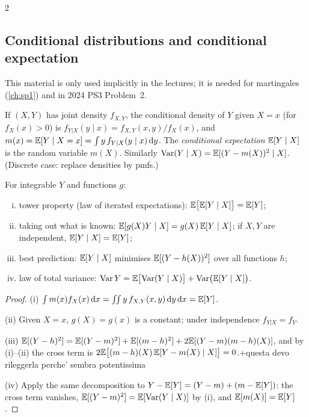 \begin{paracol}{2}
\subsection{Conditional distributions and conditional expectation}\label{ch03:sec-condexp}
This material is only used implicitly in the lectures; it is needed for martingales (\cref{ch:sp1}) and in
2024 PS3 Problem~2.

\begin{definition}
If $(X,Y)$ has joint density $f_{X,Y}$, the conditional density of $Y$ given $X=x$ (for $f_X(x)>0$) is
$f_{Y|X}(y\mid x)=f_{X,Y}(x,y)/f_X(x)$, and $m(x)=\mathbb{E}[Y\mid X=x]=\int y\,f_{Y|X}(y\mid x)\,\mathrm{d} y$. The
\emph{conditional expectation} $\mathbb{E}[Y\mid X]$ is the random variable $m(X)$. Similarly
$\operatorname{Var}(Y\mid X)=\mathbb{E}[(Y-m(X))^2\mid X]$. (Discrete case: replace densities by pmfs.)
\end{definition}

\begin{proposition}[Properties]\label{ch03:prop-condexp}
For integrable $Y$ and functions $g$:
\begin{enumerate}[(i)]
  \item tower property (law of iterated expectations): $\mathbb{E}\bigl[\mathbb{E}[Y\mid X]\bigr]=\mathbb{E}[Y]$;
  \item taking out what is known: $\mathbb{E}[g(X)Y\mid X]=g(X)\,\mathbb{E}[Y\mid X]$; if $X,Y$ are independent, $\mathbb{E}[Y\mid X]=\mathbb{E}[Y]$;
  \item best prediction: $\mathbb{E}[Y\mid X]$ minimises $\mathbb{E}[(Y-h(X))^2]$ over all functions $h$;
  \item law of total variance: $\operatorname{Var} Y=\mathbb{E}\bigl[\operatorname{Var}(Y\mid X)\bigr]+\operatorname{Var}\bigl(\mathbb{E}[Y\mid X]\bigr)$.
\end{enumerate}
\end{proposition}
\begin{proof}
(i) $\int m(x)f_X(x)\,\mathrm{d} x=\iint y\,f_{X,Y}(x,y)\,\mathrm{d} y\,\mathrm{d} x=\mathbb{E}[Y]$.

(ii) Given $X=x$, $g(X)=g(x)$ is a constant; under
independence $f_{Y|X}=f_Y$.

(iii) $\mathbb{E}[(Y-h)^2]=\mathbb{E}[(Y-m)^2]+\mathbb{E}[(m-h)^2]+2\mathbb{E}[(Y-m)(m-h)(X)]$, and by (i)--(ii) the
cross term is $2\mathbb{E}\bigl[(m-h)(X)\,\mathbb{E}[Y-m(X)\mid X]\bigr]=0$.\note+{questa devo rileggerla perche' sembra potentissima}

(iv) Apply the same decomposition to
$Y-\mathbb{E}[Y]=(Y-m)+(m-\mathbb{E}[Y])$: the cross term vanishes, $\mathbb{E}[(Y-m)^2]=\mathbb{E}[\operatorname{Var}(Y\mid X)]$ by (i), and $\mathbb{E}[m(X)]=\mathbb{E}[Y]$.
\end{proof}


\end{paracol}
